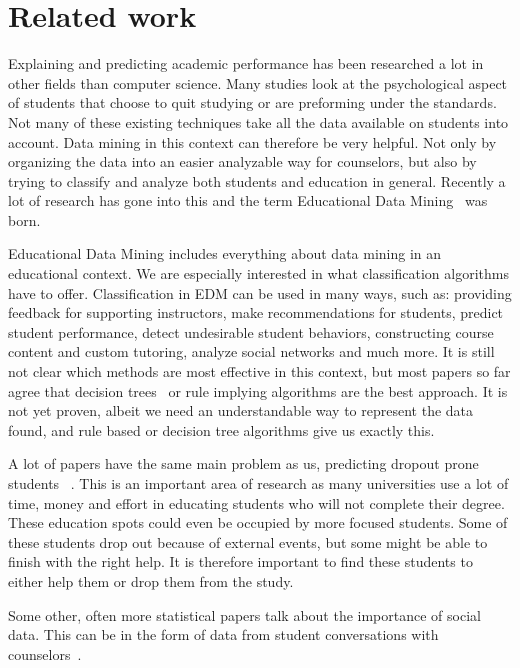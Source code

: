 \chapter{Related work}\label{ch:related}
Explaining and predicting academic performance has been researched a lot in other fields than computer science. Many studies look at the psychological aspect of students that choose to quit studying or are preforming under the standards. Not many of these existing techniques take all the data available on students into account. Data mining in this context can therefore be very helpful. Not only by organizing the data into an easier analyzable way for counselors, but also by trying to classify and analyze both students and education in general. Recently a lot of research has gone into this and the term Educational Data Mining~\cite{1} was born.

\bigskip\noindent
Educational Data Mining includes everything about data mining in an educational context.
We are especially interested in what classification algorithms have to offer. 
Classification in EDM can be used in many ways, such as:
providing feedback for supporting instructors,
make recommendations for students,
predict student performance,
detect undesirable student behaviors,
constructing course content and custom tutoring,
analyze social networks and much more.
It is still not clear which methods are most effective in this context, but most papers so far agree that decision trees~\cite{2,12} or rule implying algorithms are the best approach.
It is not yet proven, albeit we need an understandable way to represent the data found, and rule based or decision tree algorithms give us exactly this. 

\bigskip\noindent
A lot of papers have the same main problem as us, predicting dropout prone students~\cite{5,7,8,9,11} .
This is an important area of research as many universities use a lot of time, 
money and effort in educating students who will not complete their degree. 
These education spots could even be occupied by more focused students. 
Some of these students drop out because of external events, but some might be able to finish with the right help. 
It is therefore important to find these students to either help them or drop them from the study. 

\bigskip\noindent
Some other, often more statistical papers talk about the importance of social data. 
This can be in the form of data from student conversations with counselors~\cite{11}.


